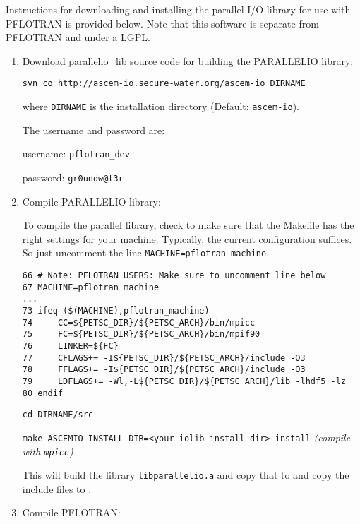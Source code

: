 Instructions for downloading and installing the parallel I/O library for use with PFLOTRAN is provided below. Note that this software is separate from PFLOTRAN and under a LGPL.
\begin{enumerate}

\item Download parallelio\_lib source code for building the PARALLELIO library:

{\small\tt svn co http://ascem-io.secure-water.org/ascem-io DIRNAME}

where {\footnotesize\tt DIRNAME} is the installation directory (Default: {\footnotesize\tt ascem-io}). 

The username and password are:

username: {\footnotesize\tt pflotran\_dev}

password: {\footnotesize\tt gr0undw@t3r}

\item Compile PARALLELIO library:

To compile the parallel library, check to make sure that the Makefile has the right settings for your machine.
Typically, the current configuration suffices.
So just uncomment the line {\small\tt MACHINE=pflotran\_machine}.
\footnotesize
\begin{Verbatim}
66 # Note: PFLOTRAN USERS: Make sure to uncomment line below
67 MACHINE=pflotran_machine
...
73 ifeq ($(MACHINE),pflotran_machine)
74     CC=${PETSC_DIR}/${PETSC_ARCH}/bin/mpicc
75     FC=${PETSC_DIR}/${PETSC_ARCH}/bin/mpif90
76     LINKER=${FC}
77     CFLAGS+= -I${PETSC_DIR}/${PETSC_ARCH}/include -O3
78     FFLAGS+= -I${PETSC_DIR}/${PETSC_ARCH}/include -O3 
79     LDFLAGS+= -Wl,-L${PETSC_DIR}/${PETSC_ARCH}/lib -lhdf5 -lz 
80 endif
\end{Verbatim}

\footnotesize
{\tt cd DIRNAME/src}

{\tt make ASCEMIO\_INSTALL\_DIR=<your-iolib-install-dir> install} \hfill {\it (compile with {\tt mpicc})}
\normalsize

This will build the library {\footnotesize\tt libparallelio.a} and copy that to  and copy the include files to .

\item Compile PFLOTRAN:


\end{enumerate}
